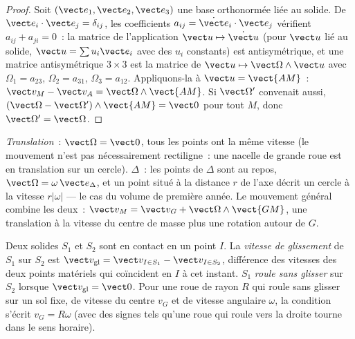 \begin{proof}
Soit $(\vect e_1, \vect e_2, \vect e_3)$ une base orthonormée liée au
solide. De $\vect e_i\cdot\vect e_j = \delta_{ij}$, les coefficients
$a_{ij} = \dot{\vect e}_i\cdot\vect e_j$ vérifient $a_{ij} + a_{ji} = 0$~: la
matrice de l'application $\vect u \mapsto \dot{\vect u}$ (pour $\vect u$ lié au
solide, $\vect u = \sum u_i\vect e_i$ avec des $u_i$ constants) est
antisymétrique, et une matrice antisymétrique $3\times3$ est la matrice de
$\vect u \mapsto \vect\Omega\wedge\vect u$ avec $\Omega_1 = a_{23}$,
$\Omega_2 = a_{31}$, $\Omega_3 = a_{12}$. Appliquons-la à $\vect u =
\vect{AM}$~: $\vect v_M - \vect v_A = \vect\Omega\wedge\vect{AM}$. Si
$\vect\Omega'$ convenait aussi, $(\vect\Omega - \vect\Omega')\wedge
\vect{AM} = \vect 0$ pour tout $M$, donc $\vect\Omega' = \vect\Omega$.
\end{proof}

\begin{remark}\label{rem:b2:rigid-body-mechanics:motions}
\emph{Translation}~: $\vect\Omega = \vect 0$, tous les points ont la même
vitesse (le mouvement n'est pas nécessairement rectiligne~: une nacelle
de grande roue est en translation sur un cercle). \emph{} $\Delta$~: les points de $\Delta$ sont au repos,
$\vect\Omega = \omega\,\vect e_\Delta$, et un point situé à la distance
$r$ de l'axe décrit un cercle à la vitesse
$r|\omega|$ --- le cas du volume de première année. Le mouvement général
combine les deux~: $\vect v_M = \vect v_G + \vect\Omega\wedge\vect{GM}$, une
translation à la vitesse du centre de masse plus une rotation autour de
$G$.
\end{remark}

\begin{definition}\label{def:b2:rigid-body-mechanics:rolling}
Deux solides $S_1$ et $S_2$ sont en contact en un point $I$. La
\emph{vitesse de glissement} de $S_1$ sur $S_2$ est $\vect v_{\text{gl}} = \vect v_{I \in S_1}
- \vect v_{I \in S_2}$, différence des vitesses des deux
points matériels qui coïncident en $I$ à cet instant. $S_1$ \emph{roule
sans glisser} sur $S_2$ lorsque $\vect v_{\text{gl}} = \vect 0$. Pour une
roue de rayon $R$ qui roule sans glisser sur un sol fixe, de
vitesse du centre $v_G$ et de vitesse angulaire $\omega$, la condition s'écrit
$v_G = R\omega$ (avec des signes tels qu'une roue qui roule vers la droite
tourne dans le sens horaire).
\end{definition}

